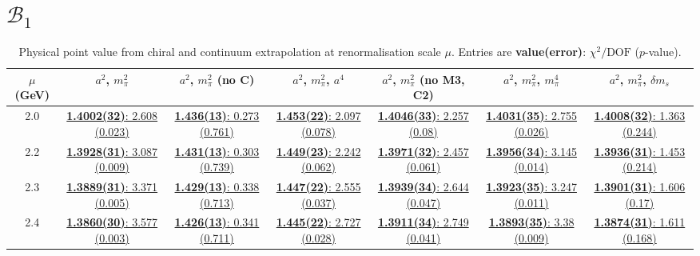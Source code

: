 \documentclass[12pt]{extarticle}
\begin{document}
\clearpage
\section{$\mathcal{B}_1$}
\begin{table}[h!]
\begin{center}
\begin{tabular}{|c|c|c|c|c|c|c|}
\hline
$\mu$ (GeV) & $a^2$, $m_\pi^2$& $a^2$, $m_\pi^2$ (no C)& $a^2$, $m_\pi^2$, $a^4$& $a^2$, $m_\pi^2$ (no M3, C2)& $a^2$, $m_\pi^2$, $m_\pi^4$& $a^2$, $m_\pi^2$, $\delta m_s$\\
\hline
2.0& \hyperlink{VVpAA/SUSY/bag_a2m2_20.pdf.1}{\textbf{1.4002(32)}: 2.608 (0.023)} & \hyperlink{VVpAA/SUSY/bag_a2m2noC_20.pdf.1}{\textbf{1.436(13)}: 0.273 (0.761)} & \hyperlink{VVpAA/SUSY/bag_a2a4m2_20.pdf.1}{\textbf{1.453(22)}: 2.097 (0.078)} & \hyperlink{VVpAA/SUSY/bag_a2m2mcut_20.pdf.1}{\textbf{1.4046(33)}: 2.257 (0.08)} & \hyperlink{VVpAA/SUSY/bag_a2m2m4_20.pdf.1}{\textbf{1.4031(35)}: 2.755 (0.026)} & \hyperlink{VVpAA/SUSY/bag_a2m2delm_20.pdf.1}{\textbf{1.4008(32)}: 1.363 (0.244)}\\
2.2& \hyperlink{VVpAA/SUSY/bag_a2m2_22.pdf.1}{\textbf{1.3928(31)}: 3.087 (0.009)} & \hyperlink{VVpAA/SUSY/bag_a2m2noC_22.pdf.1}{\textbf{1.431(13)}: 0.303 (0.739)} & \hyperlink{VVpAA/SUSY/bag_a2a4m2_22.pdf.1}{\textbf{1.449(23)}: 2.242 (0.062)} & \hyperlink{VVpAA/SUSY/bag_a2m2mcut_22.pdf.1}{\textbf{1.3971(32)}: 2.457 (0.061)} & \hyperlink{VVpAA/SUSY/bag_a2m2m4_22.pdf.1}{\textbf{1.3956(34)}: 3.145 (0.014)} & \hyperlink{VVpAA/SUSY/bag_a2m2delm_22.pdf.1}{\textbf{1.3936(31)}: 1.453 (0.214)}\\
2.3& \hyperlink{VVpAA/SUSY/bag_a2m2_23.pdf.1}{\textbf{1.3889(31)}: 3.371 (0.005)} & \hyperlink{VVpAA/SUSY/bag_a2m2noC_23.pdf.1}{\textbf{1.429(13)}: 0.338 (0.713)} & \hyperlink{VVpAA/SUSY/bag_a2a4m2_23.pdf.1}{\textbf{1.447(22)}: 2.555 (0.037)} & \hyperlink{VVpAA/SUSY/bag_a2m2mcut_23.pdf.1}{\textbf{1.3939(34)}: 2.644 (0.047)} & \hyperlink{VVpAA/SUSY/bag_a2m2m4_23.pdf.1}{\textbf{1.3923(35)}: 3.247 (0.011)} & \hyperlink{VVpAA/SUSY/bag_a2m2delm_23.pdf.1}{\textbf{1.3901(31)}: 1.606 (0.17)}\\
2.4& \hyperlink{VVpAA/SUSY/bag_a2m2_24.pdf.1}{\textbf{1.3860(30)}: 3.577 (0.003)} & \hyperlink{VVpAA/SUSY/bag_a2m2noC_24.pdf.1}{\textbf{1.426(13)}: 0.341 (0.711)} & \hyperlink{VVpAA/SUSY/bag_a2a4m2_24.pdf.1}{\textbf{1.445(22)}: 2.727 (0.028)} & \hyperlink{VVpAA/SUSY/bag_a2m2mcut_24.pdf.1}{\textbf{1.3911(34)}: 2.749 (0.041)} & \hyperlink{VVpAA/SUSY/bag_a2m2m4_24.pdf.1}{\textbf{1.3893(35)}: 3.38 (0.009)} & \hyperlink{VVpAA/SUSY/bag_a2m2delm_24.pdf.1}{\textbf{1.3874(31)}: 1.611 (0.168)}\\
\hline
\end{tabular}
\caption{Physical point value from chiral and continuum extrapolation at renormalisation scale $\mu$. Entries are \textbf{value(error)}: $\chi^2/\text{DOF}$ ($p$-value).}
\end{center}
\end{table}
\end{document}

